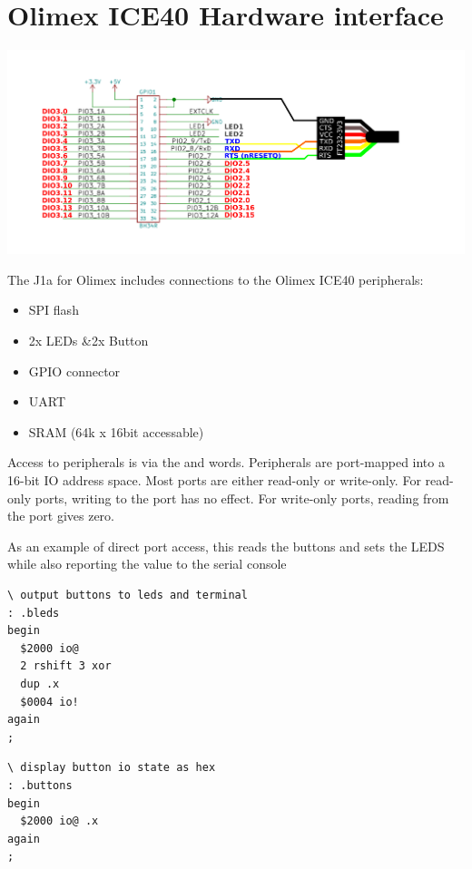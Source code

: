 \chapter{Olimex ICE40 Hardware interface}

\begin{center}
\includegraphics[width=1.0\textwidth]{olimex_io.png}
\end{center}

The J1a for Olimex includes connections to the Olimex ICE40 peripherals:
\begin{itemize}
\item SPI flash 
\item 2x LEDs &2x Button 
\item GPIO connector 
\item UART 
\item SRAM (64k x 16bit accessable)
\end{itemize}

Access to peripherals is via the
 and  words.
Peripherals are port-mapped into a 16-bit IO address space.
Most ports are either read-only or write-only.
For read-only ports, writing to the port has no effect.
For write-only ports, reading from the port gives zero.

As an example of direct port access, this reads the buttons and sets the LEDS while also reporting the value to the serial console

\begin{framed}
\begin{Verbatim}
\ output buttons to leds and terminal
: .bleds
begin
  $2000 io@
  2 rshift 3 xor
  dup .x
  $0004 io!
again
;
\end{Verbatim}
\end{framed}


\begin{framed}
\begin{Verbatim}
\ display button io state as hex 
: .buttons
begin
  $2000 io@ .x
again
;
\end{Verbatim}
\end{framed}


